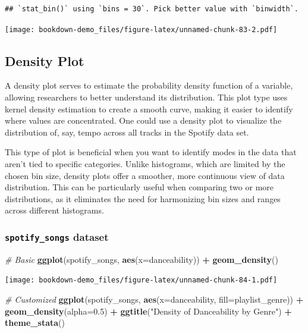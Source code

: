\documentclass[
  b5paper]{book}
\newenvironment{Shaded}{\begin{snugshade}}{\end{snugshade}}
\newcommand{\AttributeTok}[1]{\textcolor[rgb]{0.13,0.29,0.53}{#1}}
\newcommand{\CommentTok}[1]{\textcolor[rgb]{0.56,0.35,0.01}{\textit{#1}}}
\newcommand{\FloatTok}[1]{\textcolor[rgb]{0.00,0.00,0.81}{#1}}
\newcommand{\FunctionTok}[1]{\textcolor[rgb]{0.13,0.29,0.53}{\textbf{#1}}}
\newcommand{\NormalTok}[1]{#1}
\newcommand{\SpecialCharTok}[1]{\textcolor[rgb]{0.81,0.36,0.00}{\textbf{#1}}}
\newcommand{\StringTok}[1]{\textcolor[rgb]{0.31,0.60,0.02}{#1}}
\begin{document}
\begin{verbatim}
## `stat_bin()` using `bins = 30`. Pick better value with `binwidth`.
\end{verbatim}

\texttt{[image: bookdown-demo\_files/figure-latex/unnamed-chunk-83-2.pdf]}

\hypertarget{density-plot}{%
\subsection*{Density Plot}\label{density-plot}}

A density plot serves to estimate the probability density function of a variable, allowing researchers to better understand its distribution. This plot type uses kernel density estimation to create a smooth curve, making it easier to identify where values are concentrated. One could use a density plot to visualize the distribution of, say, tempo across all tracks in the Spotify data set.

This type of plot is beneficial when you want to identify modes in the data that aren't tied to specific categories. Unlike histograms, which are limited by the chosen bin size, density plots offer a smoother, more continuous view of data distribution. This can be particularly useful when comparing two or more distributions, as it eliminates the need for harmonizing bin sizes and ranges across different histograms.

\hypertarget{spotify_songs-dataset-6}{%
\subsubsection*{\texorpdfstring{\texttt{spotify\_songs} dataset}{spotify\_songs dataset}}\label{spotify_songs-dataset-6}}

\begin{Shaded}
\begin{Highlighting}[]
\CommentTok{\# Basic}
\FunctionTok{ggplot}\NormalTok{(spotify\_songs, }\FunctionTok{aes}\NormalTok{(}\AttributeTok{x=}\NormalTok{danceability)) }\SpecialCharTok{+} \FunctionTok{geom\_density}\NormalTok{()}
\end{Highlighting}
\end{Shaded}

\texttt{[image: bookdown-demo\_files/figure-latex/unnamed-chunk-84-1.pdf]}

\begin{Shaded}
\begin{Highlighting}[]
\CommentTok{\# Customized}
\FunctionTok{ggplot}\NormalTok{(spotify\_songs, }\FunctionTok{aes}\NormalTok{(}\AttributeTok{x=}\NormalTok{danceability, }\AttributeTok{fill=}\NormalTok{playlist\_genre)) }\SpecialCharTok{+}
  \FunctionTok{geom\_density}\NormalTok{(}\AttributeTok{alpha=}\FloatTok{0.5}\NormalTok{) }\SpecialCharTok{+}
  \FunctionTok{ggtitle}\NormalTok{(}\StringTok{"Density of Danceability by Genre"}\NormalTok{) }\SpecialCharTok{+}
  \FunctionTok{theme\_stata}\NormalTok{()}
\end{Highlighting}
\end{Shaded}
\end{document}

